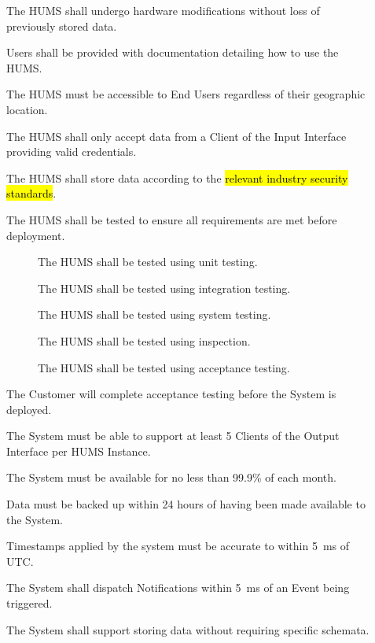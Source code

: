 \begin{description}
	\item[] The HUMS shall undergo hardware modifications without loss 
	of previously stored data.
	\item[] Users shall be provided with documentation detailing 
	how to use the HUMS.
	\item[] The HUMS must be accessible to End Users regardless of
	their geographic location.
	\item[]  The HUMS shall only accept data from a Client of the Input
	Interface providing valid credentials.
	\item[] The HUMS shall store data according to the \hl{relevant
	industry security standards}.
	\item[]  The HUMS shall be tested to ensure all requirements are 
	met before deployment.
	\begin{description}
	\item[]  The HUMS shall be tested using unit testing.
	\item[]  The HUMS shall be tested using integration testing.
	\item[]  The HUMS shall be tested using system testing.
	\item[]  The HUMS shall be tested using inspection.
	\item[]  The HUMS shall be tested using acceptance testing.
	\end{description}
	\item[] The Customer will complete acceptance testing before the System is deployed.
	\item[] The System must be able to support at least 5 Clients of the Output Interface per HUMS Instance. 
	\item[] The System must be available for no less than 99.9\% of 
	each month.
	\item[] Data must be backed up within 24 hours of having been 
	made available to the System.
	 \item[] Timestamps applied by the system must be accurate to 
	within 5~ms of UTC.
	\item[]  The System shall dispatch Notifications within 5~ms of an 
	Event being triggered.
	\item[] The System shall support storing data without requiring 
	specific schemata.
\end{description}

